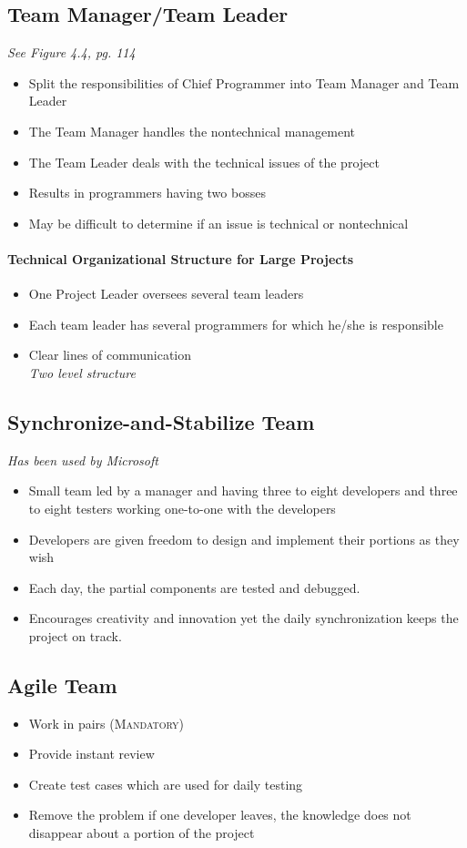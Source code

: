 \documentclass{report}
\begin{document}
			\subsection{Team Manager/Team Leader}
				\textit{See Figure 4.4, pg. 114}
				\begin{itemize}
					\item Split the responsibilities of Chief Programmer into Team Manager and Team Leader
					\item The Team Manager handles the nontechnical management
					\item The Team Leader deals with the technical issues of the project
					\item Results in programmers having two bosses
					\item May be difficult to determine if an issue is technical or nontechnical
				\end{itemize}
				\paragraph{Technical Organizational Structure for Large Projects}
					\begin{itemize}
						\item One Project Leader oversees several team leaders
						\item Each team leader has several programmers for which he/she is responsible
						\item Clear lines of communication\\
							\textit{Two level structure}
					\end{itemize}
			\subsection{Synchronize-and-Stabilize Team}
				\textit{Has been used by Microsoft}
				\begin{itemize}
					\item Small team led by a manager and having three to eight developers and three to eight testers working one-to-one with the developers
					\item Developers are given freedom to design and implement their portions as they wish
					\item Each day, the partial components are tested and debugged.
					\item Encourages creativity and innovation yet the daily synchronization keeps the project on track.
				\end{itemize}
			\subsection{Agile Team}
				\begin{itemize}
					\item Work in pairs (\textsc{Mandatory})
					\item Provide instant review
					\item Create test cases which are used for daily testing
					\item Remove the problem if one developer leaves, the knowledge does not disappear about a portion of the project
				\end{itemize}
\end{document}

